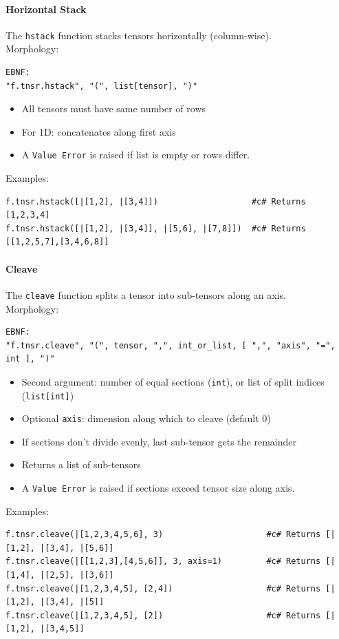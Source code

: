 \paragraph{Horizontal Stack}
The \texttt{hstack} function stacks tensors horizontally (column-wise).\\
Morphology:
\begin{verbatim}
EBNF:
"f.tnsr.hstack", "(", list[tensor], ")"
\end{verbatim}
\begin{itemize}
\item All tensors must have same number of rows
\item For 1D: concatenates along first axis
\item A \texttt{Value Error} is raised if list is empty or rows differ.
\end{itemize}
Examples:
\begin{verbatim}
f.tnsr.hstack([|[1,2], |[3,4]])                   #c# Returns [1,2,3,4]
f.tnsr.hstack([|[1,2], |[3,4]], |[5,6], |[7,8]])  #c# Returns [[1,2,5,7],[3,4,6,8]]
\end{verbatim}

\paragraph{Cleave}
The \texttt{cleave} function splits a tensor into sub-tensors along an axis.\\
Morphology:
\begin{verbatim}
EBNF:
"f.tnsr.cleave", "(", tensor, ",", int_or_list, [ ",", "axis", "=", int ], ")"
\end{verbatim}
\begin{itemize}
\item Second argument: number of equal sections (\texttt{int}), or list of split indices (\texttt{list[int]})
\item Optional \texttt{axis}: dimension along which to cleave (default 0)
\item If sections don't divide evenly, last sub-tensor gets the remainder
\item Returns a list of sub-tensors
\item A \texttt{Value Error} is raised if sections exceed tensor size along axis.
\end{itemize}
Examples:
\begin{verbatim}
f.tnsr.cleave(|[1,2,3,4,5,6], 3)                     #c# Returns [|[1,2], |[3,4], |[5,6]]
f.tnsr.cleave(|[[1,2,3],[4,5,6]], 3, axis=1)         #c# Returns [|[1,4], |[2,5], |[3,6]]
f.tnsr.cleave(|[1,2,3,4,5], [2,4])                   #c# Returns [|[1,2], |[3,4], |[5]]
f.tnsr.cleave(|[1,2,3,4,5], [2])                     #c# Returns [|[1,2], |[3,4,5]]
\end{verbatim}

